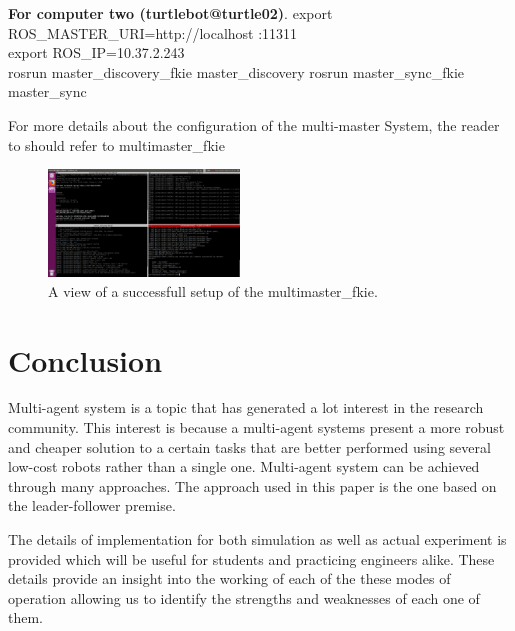 \documentclass[journal]{IEEEtran}
\begin{document}
\begin{enumerate}
\begin{enumerate}
\begin{enumerate}
\textbf{For computer two (turtlebot@turtle02)}.
export ROS{\_}MASTER{\_}URI=http://localhost :11311\\
export ROS{\_}IP=10.37.2.243\\
rosrun master{\_}discovery{\_}fkie master{\_}discovery
rosrun master{\_}sync{\_}fkie master{\_}sync
\end{enumerate}
For more details about the configuration of the multi-master System, the reader to should refer to multimaster{\_}fkie\cite{temp11}

\begin{figure}[!h]
\begin{center}
\includegraphics[width=2in]{5.png}
\caption{A view of a successfull setup of the multimaster{\_}fkie.}
\end{center}
\label{fig:mypicture4}
\end{figure}


\end{enumerate}











\end{enumerate}
\section{Conclusion}


Multi-agent system is a topic that has generated a lot interest in the research community. This interest is because a multi-agent systems present a more robust and cheaper solution to a certain tasks that are better performed using several low-cost robots rather than a single one. Multi-agent system can be achieved through many approaches. The approach used in this paper is the one based on the leader-follower premise.

The details of implementation for both simulation as well
as actual experiment is provided which will be useful for
students and practicing engineers alike. These details provide
an insight into the working of each of the these modes of
operation allowing us to identify the strengths and weaknesses
of each one of them.
\end{document}

